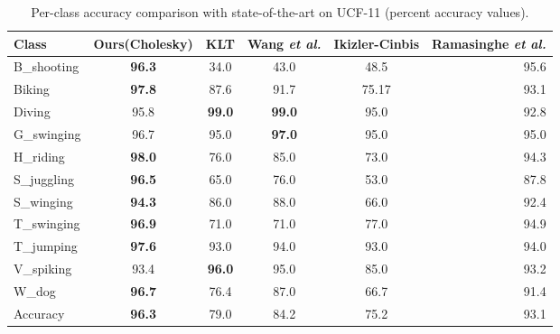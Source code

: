 \begin{table*}[]
\centering
\caption{Per-class accuracy comparison with state-of-the-art on UCF-11 (percent accuracy values).}\label{tbl:per-action ucf}
\begin{tabular}{@{} l c c c c r @{}}
\toprule
Class            & Ours(Cholesky) & KLT\cite{lucas1981iterative} & Wang \emph{et al.}\cite{wang2011action} & Ikizler-Cinbis\cite{ikizler2010object} & Ramasinghe \emph{et al.}\cite{7486474} \\ \midrule \midrule
B\_shooting       & \textbf{96.3}    &  34.0   &  43.0   & 48.5    &   95.6  \\
Biking           & \textbf{97.8}    &  87.6   &  91.7   & 75.17    &  93.1   \\
Diving           & 95.8    &  \textbf{99.0}   &  \textbf{99.0}   & 95.0    &   92.8  \\
G\_swinging       & 96.7    &  95.0   &  \textbf{97.0}   & 95.0    &   95.0  \\
H\_riding         & \textbf{98.0}    &  76.0   &  85.0   & 73.0    &   94.3  \\
S\_juggling       & \textbf{96.5}    &  65.0   &  76.0   & 53.0    &   87.8  \\
S\_winging         & \textbf{94.3}    &  86.0   &  88.0   & 66.0    &   92.4  \\
T\_swinging       & \textbf{96.9}    &  71.0   &  71.0   & 77.0   &   94.9  \\
T\_jumping        & \textbf{97.6}    &  93.0   &  94.0   & 93.0    &   94.0  \\
V\_spiking        & 93.4    &  \textbf{96.0}   &  95.0   & 85.0    &   93.2  \\
W\_dog            & \textbf{96.7}    &  76.4   &  87.0   & 66.7    &   91.4  \\ \midrule
Accuracy &  \textbf{96.3}   &  79.0   &  84.2   & 75.2    &   93.1  \\ \bottomrule
\end{tabular}
\end{table*}

